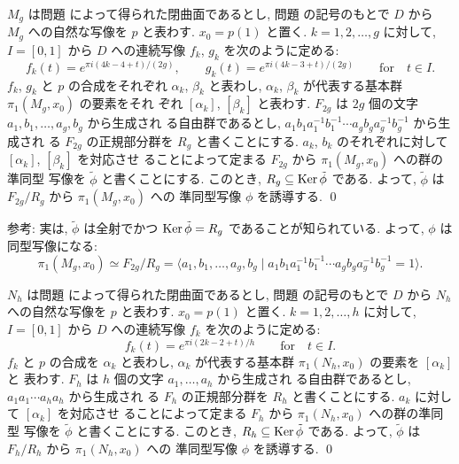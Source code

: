 \documentclass[12pt,twoside]{jarticle}
\def\Ker{\mathop{\text{\rm Ker}}\nolimits}   %
\begin{document}
\begin{question}
  $M_g$ は問題  によって得られた閉曲面であるとし, %
  問題   の記号のもとで $D$ から $M_g$ への自然な写像を %
  $p$ と表わす. $x_0 = p(1)$ と置く. %
  $k = 1,2,\dots,g$ に対して, $I = [0,1]$ から $D$ への連続写像 %
  $f_k$, $g_k$ を次のように定める:
  \[
    f_k(t) = e^{\pi i(4k-4+t  )/(2g)},
    \qquad
    g_k(t) = e^{\pi i(4k-3+t)  /(2g)}
    \qquad\text{for}\quad
    t \in I.    
  \] %
  $f_k$, $g_k$ と $p$ の合成をそれぞれ $\alpha_k$, $\beta_k$ と表わし,
  $\alpha_k$, $\beta_k$ が代表する基本群 $\pi_1(M_g,x_0)$ の要素をそれ
  ぞれ $[\alpha_k]$, $[\beta_k]$ と表わす. %
  $F_{2g}$ は $2g$ 個の文字 $a_1,b_1,\dots,a_g,b_g$ から生成され
  る自由群であるとし, %
  $a_1b_1a_1^{-1}b_1^{-1}\cdots a_g b_g a_g^{-1}b_g^{-1}$ から生成され
  る $F_{2g}$ の正規部分群を $R_g$ と書くことにする. %
  $a_k$, $b_k$ のそれぞれに対して $[\alpha_k]$, $[\beta_k]$ を対応させ
  ることによって定まる %
  $F_{2g}$ から $\pi_1(M_g,x_0)$ への群の準同型
  写像を $\tilde\phi$ と書くことにする. %
  このとき, $R_g \subseteq \Ker\tilde\phi$ である. %
  よって, $\tilde\phi$ は $F_{2g}/R_g$ から $\pi_1(M_g,x_0)$ への
  準同型写像 $\phi$ を誘導する. \qed
\end{question}

\noindent 参考: 実は, $\tilde\phi$ は全射でかつ $\Ker\tilde\phi = R_g$ %
であることが知られている. よって, $\phi$ は同型写像になる:
\[
  \pi_1(M_g,x_0)
  \simeq
  F_{2g}/R_g
  =
  \langle
    a_1,b_1, \dots, a_g, b_g
  \mid
    a_1 b_1 a_1^{-1} b_1^{-1} \cdots a_g b_g a_g^{-1} b_g^{-1} = 1
  \rangle.
\]

\begin{question}
  $N_h$ は問題  によって得られた閉曲面であるとし, %
  問題   の記号のもとで $D$ から $N_h$ への自然な写像を %
  $p$ と表わす. $x_0 = p(1)$ と置く. %
  $k = 1,2,\dots,h$ に対して, $I = [0,1]$ から $D$ への連続写像 %
  $f_k$ を次のように定める:
  \[
    f_k(t) = e^{\pi i(2k-2+t)/h}
    \qquad\text{for}\quad
    t \in I.    
  \] %
  $f_k$ と $p$ の合成を $\alpha_k$ と表わし,
  $\alpha_k$ が代表する基本群 $\pi_1(N_h,x_0)$ の要素を $[\alpha_k]$ と
  表わす. %
  $F_h$ は $h$ 個の文字 $a_1,\dots,a_h$ から生成され
  る自由群であるとし, %
  $a_1 a_1\cdots a_h a_h$ から生成され
  る $F_h$ の正規部分群を $R_h$ と書くことにする. %
  $a_k$ に対して $[\alpha_k]$ を対応させ
  ることによって定まる %
  $F_h$ から $\pi_1(N_h,x_0)$ への群の準同型
  写像を $\tilde\phi$ と書くことにする. %
  このとき, $R_h \subseteq \Ker\tilde\phi$ である. %
  よって, $\tilde\phi$ は $F_h/R_h$ から $\pi_1(N_h,x_0)$ への
  準同型写像 $\phi$ を誘導する. \qed
\end{question}
\end{document}
